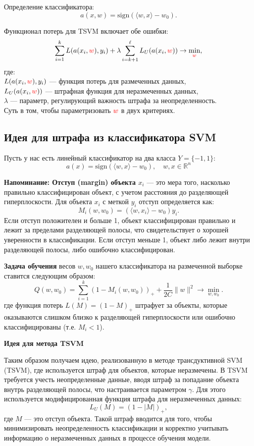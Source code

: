 Определение классификатора:
\[
    a(x, w) = \text{sign}(\langle w, x \rangle - w_0).
\]

Функционал потерь для TSVM включает обе ошибки:
\[
    \sum\limits_{i=1}^{k} L(a(x_i, \textcolor{red}{w}), y_i) + \lambda 
    \sum_{i=k+1}^{\ell} L_U(a(x_i, \textcolor{red}{w})) \to 
    \min_{\textcolor{red}{w}},
\]
где:\\
\( L(a(x_i, \textcolor{red}{w}), y_i) \) — функция потерь для размеченных данных,\\
\( L_U(a(x_i, \textcolor{red}{w})) \) — штрафная функция для неразмеченных данных,\\
\( \lambda \) — параметр, регулирующий важность штрафа за неопределенность.\\

Суть в том, чтобы параметризовать $\textcolor{red}{w}$ в двух критериях. 
\subsection{Идея для штрафа из классификатора SVM}
Пусть у нас есть линейный классификатор на два класса \( Y = \{-1, 1\} \):
\[
    a(x) = \text{sign} \left( \langle w, x \rangle - w_0 \right), \quad w, x \in \mathbb{R}^n
\]

\textbf{Напоминание: Отступ (margin) объекта \( x_i \)} — это мера того, насколько правильно классифицирован объект, с учетом расстояния до разделяющей гиперплоскости. Для объекта \( x_i \) с меткой \( y_i \) отступ определяется как:
\[
    M_i(w, w_0) = \left( \langle w, x_i \rangle - w_0 \right) y_i.
\]
Если отступ положителен и больше 1, объект классифицирован правильно и лежит за пределами разделяющей полосы, что свидетельствует о хорошей уверенности в классификации. Если отступ меньше 1, объект либо лежит внутри разделяющей полосы, либо ошибочно классифицирован.

\textbf{Задача обучения} весов \( w, w_0 \) нашего классификатора на размеченной выборке ставится следующим образом:
\[
    Q(w, w_0) = \sum_{i=1}^{k} \left( 1 - M_i(w, w_0) \right)_+ + \frac{1}{2C} \|w\|^2 \to \min_{w, w_0}.
\]
где функция потерь \( L(M) = (1 - M)_+ \) штрафует за объекты, которые оказываются слишком близко к разделяющей гиперплоскости или ошибочно классифицированы (т.е. \( M_i < 1 \)).

\vspace{1em}
\textbf{Идея для метода TSVM}

Таким образом получаем идею, реализованную в методе трансдуктивной SVM (TSVM), где используется штраф для объектов, которые неразмечены. В TSVM требуется учесть неопределенные данные, вводя штраф за попадание объекта внутрь разделяющей полосы, что настраивается параметром \( \gamma \). Для этого используется модифицированная функция штрафа для неразмеченных данных:
\[
    L_U(M) = \left( 1 - |M| \right)_+,
\]
где \( M \) — это отступ объекта. Такой штраф вводится для того, чтобы минимизировать неопределенность классификации и корректно учитывать информацию о неразмеченных данных в процессе обучения модели.

